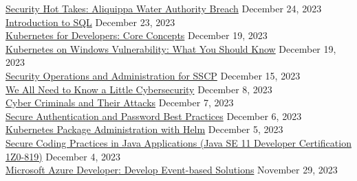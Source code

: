 \documentclass[10pt]{res} %
\begin{document}
\begin{resume}
\href{https://bjdelacruz.dev/files/certificates/pluralsight/Security_Hot_Takes_-_Aliquippa_Water_Authority_Breach.pdf}{\color{blue}Security Hot Takes: Aliquippa Water Authority Breach} \hfill December 24, 2023 \\
\href{https://bjdelacruz.dev/files/certificates/pluralsight/Introduction_to_SQL.pdf}{\color{blue}Introduction to SQL} \hfill December 23, 2023 \\
\href{https://bjdelacruz.dev/files/certificates/pluralsight/Kubernetes_for_Developers_-_Core_Concepts.pdf}{\color{blue}Kubernetes for Developers: Core Concepts} \hfill December 19, 2023 \\
\href{https://bjdelacruz.dev/files/certificates/pluralsight/Kubernetes_on_Windows_Vulnerability_-_What_You_Should_Know.pdf}{\color{blue}Kubernetes on Windows Vulnerability: What You Should Know} \hfill December 19, 2023 \\
\href{https://bjdelacruz.dev/files/certificates/pluralsight/Security_Operations_and_Administration_for_SSCP.pdf}{\color{blue}Security Operations and Administration for SSCP\textsuperscript{\textregistered}} \hfill December 15, 2023 \\
\href{https://bjdelacruz.dev/files/certificates/pluralsight/1_We_All_Need_to_Know_a_Little_Cybersecurity.pdf}{\color{blue}We All Need to Know a Little Cybersecurity} \hfill December 8, 2023 \\
\href{https://bjdelacruz.dev/files/certificates/pluralsight/2_Cyber_Criminals_and_Their_Attacks.pdf}{\color{blue}Cyber Criminals and Their Attacks} \hfill December 7, 2023 \\
\href{https://bjdelacruz.dev/files/certificates/pluralsight/3_Secure_Authentication_and_Password_Best_Practices.pdf}{\color{blue}Secure Authentication and Password Best Practices} \hfill December 6, 2023 \\
\href{https://bjdelacruz.dev/files/certificates/pluralsight/Kubernetes_Package_Administration_with_Helm.pdf}{\color{blue}Kubernetes Package Administration with Helm} \hfill December 5, 2023 \\
\href{https://bjdelacruz.dev/files/certificates/pluralsight/8_Secure_Coding_Practices_in_Java_Applications_Java_SE_11_Developer_Certification_1Z0_819.pdf}{\color{blue}Secure Coding Practices in Java Applications (Java SE 11 Developer Certification 1Z0-819)} \hfill December 4, 2023 \\
\href{https://bjdelacruz.dev/files/certificates/pluralsight/Microsoft_Azure_Developer_Develop_Event_based_Solutions.pdf}{\color{blue}Microsoft Azure Developer: Develop Event-based Solutions} \hfill November 29, 2023 \\

\end{resume}
\end{document}
